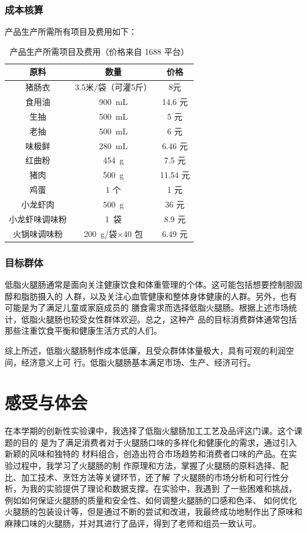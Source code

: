 \documentclass[UTF8]{ctexart}
\begin{document}
	\subsubsection{成本核算}
	
	产品生产所需所有项目及费用如下：
	\begin{table}[htb]
		\centering
			\caption{产品生产所需项目及费用（价格来自 1688 平台）}
			\begin{tabular}{ccc}
				\toprule
				原料 & 数量 & 价格\\
				\midrule
				猪肠衣 & 3.5米$/$袋（可灌5斤） & 8元\\
				食用油 & 900~mL & 14.6 元\\
				生抽 & 500~mL & 5 元\\
				老抽 & 500~mL & 6 元\\
				味极鲜 & 280~mL & 6.46 元\\
				红曲粉 & 454~g & 7.5 元\\
				猪肉 & 500~g & 11.54 元\\
				鸡蛋 & 1 个 & 1 元\\
				小龙虾肉 & 500~g & 36 元\\
				小龙虾味调味粉 & 1~袋 & 8.9 元\\
				火锅味调味粉 & 200~g/袋$\times$40 包 & 6.49 元\\		
				\bottomrule
			\end{tabular}
	\end{table}
	
	\subsubsection{目标群体}
	低脂火腿肠通常是面向关注健康饮食和体重管理的个体。这可能包括想要控制胆固醇和脂肪摄入的
	人群，以及关注心血管健康和整体身体健康的人群。另外，也有可能是为了满足儿童或家庭成员的
	膳食需求而选择低脂火腿肠。根据上述市场统计，低脂火腿肠也较受女性群体欢迎。总之，这种产
	品的目标消费群体通常包括那些注重饮食平衡和健康生活方式的人们。

	综上所述，低脂火腿肠制作成本低廉，且受众群体体量极大，具有可观的利润空间，经济意义上可
	行。低脂火腿肠基本满足市场、生产、经济可行。


	\section{感受与体会}

		在本学期的创新性实验课中，我选择了低脂火腿肠加工工艺及品评这门课。这个课题的目的
		是为了满足消费者对于火腿肠口味的多样化和健康化的需求，通过引入新颖的风味和独特的
		材料组合，创造出符合市场趋势和消费者口味的产品。在实验过程中，我学习了火腿肠的制
		作原理和方法，掌握了火腿肠的原料选择、配比、加工技术、烹饪方法等关键环节，还了解
		了火腿肠的市场分析和可行性分析，为我的实验提供了理论和数据支撑。在实验中，我遇到
		了一些困难和挑战，例如如何保证火腿肠的质量和安全性、如何调整火腿肠的口感和色泽、
		如何优化火腿肠的包装设计等，但是通过不断的尝试和改进，我最终成功地制作出了原味和
		麻辣口味的火腿肠，并对其进行了品评，得到了老师和组员一致认可。
\end{document}
